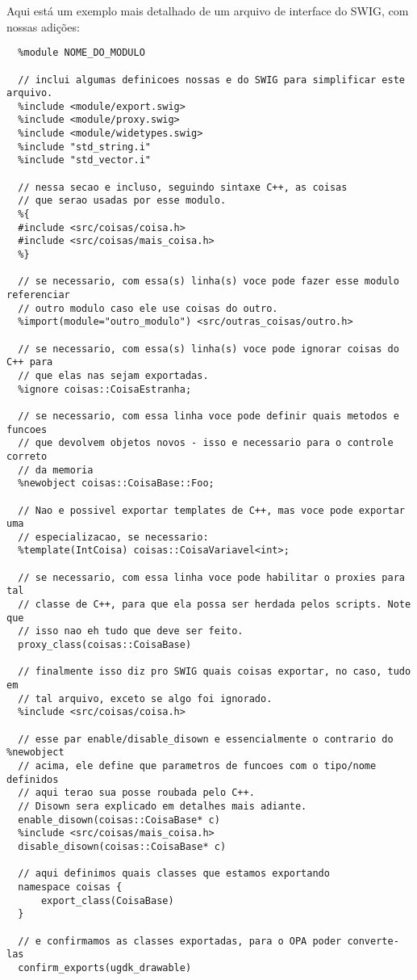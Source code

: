   Aqui está um exemplo mais detalhado de um arquivo de interface do SWIG, com nossas 
  adições:
  \begin{lstlisting}
  %module NOME_DO_MODULO

  // inclui algumas definicoes nossas e do SWIG para simplificar este arquivo.
  %include <module/export.swig>
  %include <module/proxy.swig>
  %include <module/widetypes.swig>
  %include "std_string.i"
  %include "std_vector.i"
  
  // nessa secao e incluso, seguindo sintaxe C++, as coisas
  // que serao usadas por esse modulo.
  %{
  #include <src/coisas/coisa.h>
  #include <src/coisas/mais_coisa.h>
  %}

  // se necessario, com essa(s) linha(s) voce pode fazer esse modulo referenciar 
  // outro modulo caso ele use coisas do outro.
  %import(module="outro_modulo") <src/outras_coisas/outro.h>

  // se necessario, com essa(s) linha(s) voce pode ignorar coisas do C++ para 
  // que elas nas sejam exportadas.
  %ignore coisas::CoisaEstranha;
  
  // se necessario, com essa linha voce pode definir quais metodos e funcoes
  // que devolvem objetos novos - isso e necessario para o controle correto 
  // da memoria
  %newobject coisas::CoisaBase::Foo;
  
  // Nao e possivel exportar templates de C++, mas voce pode exportar uma 
  // especializacao, se necessario:
  %template(IntCoisa) coisas::CoisaVariavel<int>;

  // se necessario, com essa linha voce pode habilitar o proxies para tal 
  // classe de C++, para que ela possa ser herdada pelos scripts. Note que
  // isso nao eh tudo que deve ser feito.
  proxy_class(coisas::CoisaBase)

  // finalmente isso diz pro SWIG quais coisas exportar, no caso, tudo em
  // tal arquivo, exceto se algo foi ignorado.
  %include <src/coisas/coisa.h>
  
  // esse par enable/disable_disown e essencialmente o contrario do %newobject
  // acima, ele define que parametros de funcoes com o tipo/nome definidos
  // aqui terao sua posse roubada pelo C++. 
  // Disown sera explicado em detalhes mais adiante.
  enable_disown(coisas::CoisaBase* c)
  %include <src/coisas/mais_coisa.h>
  disable_disown(coisas::CoisaBase* c)

  // aqui definimos quais classes que estamos exportando
  namespace coisas {
      export_class(CoisaBase)
  }

  // e confirmamos as classes exportadas, para o OPA poder converte-las
  confirm_exports(ugdk_drawable)
  \end{lstlisting}
  
